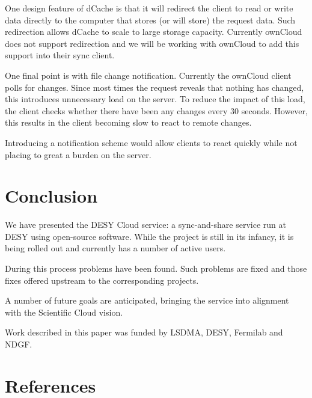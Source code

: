 \documentclass[a4paper]{jpconf}
\begin{document}
One design feature of dCache is that it will redirect the client to
read or write data directly to the computer that stores (or will
store) the request data.  Such redirection allows dCache to scale to
large storage capacity.  Currently ownCloud does not support
redirection and we will be working with ownCloud to add this support
into their sync client.

One final point is with file change notification.  Currently the
ownCloud client polls for changes.  Since most times the request
reveals that nothing has changed, this introduces unnecessary load on
the server.  To reduce the impact of this load, the client checks
whether there have been any changes every 30 seconds.  However, this
results in the client becoming slow to react to remote changes.

Introducing a notification scheme would allow clients to react quickly
while not placing to great a burden on the server.

\section{Conclusion}

We have presented the DESY Cloud service: a sync-and-share service run
at DESY using open-source software.  While the project is still in its
infancy, it is being rolled out and currently has a number of active
users.

During this process problems have been found.  Such problems are fixed
and those fixes offered upstream to the corresponding projects.

A number of future goals are anticipated, bringing the service into
alignment with the Scientific Cloud vision.

\ack

Work described in this paper was funded by LSDMA, DESY, Fermilab and
NDGF.

\section*{References}

\end{document}
